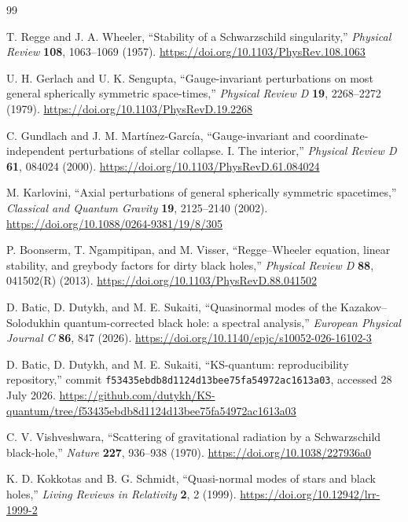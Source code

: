 \documentclass[12pt,a4paper]{article}
\begin{document}
\begin{thebibliography}{99}

T. Regge and J. A. Wheeler,
``Stability of a Schwarzschild singularity,''
\emph{Physical Review} \textbf{108}, 1063--1069 (1957).
\url{https://doi.org/10.1103/PhysRev.108.1063}
\color{blue}

U. H. Gerlach and U. K. Sengupta,
``Gauge-invariant perturbations on most general spherically symmetric
space-times,''
\emph{Physical Review D} \textbf{19}, 2268--2272 (1979).
\url{https://doi.org/10.1103/PhysRevD.19.2268}

C. Gundlach and J. M. Mart\'inez-Garc\'ia,
``Gauge-invariant and coordinate-independent perturbations of stellar
collapse. I. The interior,''
\emph{Physical Review D} \textbf{61}, 084024 (2000).
\url{https://doi.org/10.1103/PhysRevD.61.084024}

M. Karlovini,
``Axial perturbations of general spherically symmetric spacetimes,''
\emph{Classical and Quantum Gravity} \textbf{19}, 2125--2140 (2002).
\url{https://doi.org/10.1088/0264-9381/19/8/305}

P. Boonserm, T. Ngampitipan, and M. Visser,
``Regge--Wheeler equation, linear stability, and greybody factors for dirty
black holes,''
\emph{Physical Review D} \textbf{88}, 041502(R) (2013).
\url{https://doi.org/10.1103/PhysRevD.88.041502}

D. Batic, D. Dutykh, and M. E. Sukaiti,
``Quasinormal modes of the Kazakov--Solodukhin quantum-corrected black hole:
a spectral analysis,''
\emph{European Physical Journal C} \textbf{86}, 847 (2026).
\url{https://doi.org/10.1140/epjc/s10052-026-16102-3}

D. Batic, D. Dutykh, and M. E. Sukaiti,
``KS-quantum: reproducibility repository,'' commit
\nolinkurl{f53435ebdb8d1124d13bee75fa54972ac1613a03}, accessed 28 July 2026.
\url{https://github.com/dutykh/KS-quantum/tree/f53435ebdb8d1124d13bee75fa54972ac1613a03}
\color{black}

C. V. Vishveshwara,
``Scattering of gravitational radiation by a Schwarzschild black-hole,''
\emph{Nature} \textbf{227}, 936--938 (1970).
\url{https://doi.org/10.1038/227936a0}

K. D. Kokkotas and B. G. Schmidt,
``Quasi-normal modes of stars and black holes,''
\emph{Living Reviews in Relativity} \textbf{2}, 2 (1999).
\url{https://doi.org/10.12942/lrr-1999-2}


\end{thebibliography}
\end{document}
